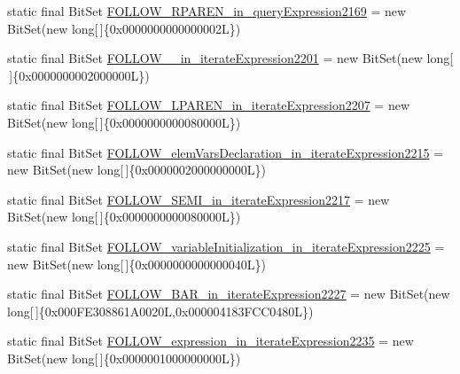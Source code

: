 \begin{DoxyCompactItemize}
\item 
static final Bit\-Set \hyperlink{classorg_1_1tzi_1_1use_1_1parser_1_1testsuite_1_1_test_suite_parser_a4e7e2ebffa87fc40630cc18b11d8a7e7}{F\-O\-L\-L\-O\-W\-\_\-\-R\-P\-A\-R\-E\-N\-\_\-in\-\_\-query\-Expression2169} = new Bit\-Set(new long\mbox{[}$\,$\mbox{]}\{0x0000000000000002\-L\})
\item 
static final Bit\-Set \hyperlink{classorg_1_1tzi_1_1use_1_1parser_1_1testsuite_1_1_test_suite_parser_a78d0d8eeefcde2904c740bc45a37cab9}{F\-O\-L\-L\-O\-W\-\_\-\_\-in\-\_\-iterate\-Expression2201} = new Bit\-Set(new long\mbox{[}$\,$\mbox{]}\{0x0000000002000000\-L\})
\item 
static final Bit\-Set \hyperlink{classorg_1_1tzi_1_1use_1_1parser_1_1testsuite_1_1_test_suite_parser_ae129c137ea4532dccebd9c1ed7f21a38}{F\-O\-L\-L\-O\-W\-\_\-\-L\-P\-A\-R\-E\-N\-\_\-in\-\_\-iterate\-Expression2207} = new Bit\-Set(new long\mbox{[}$\,$\mbox{]}\{0x0000000000080000\-L\})
\item 
static final Bit\-Set \hyperlink{classorg_1_1tzi_1_1use_1_1parser_1_1testsuite_1_1_test_suite_parser_ab47acebe7847abf50196fcc7c462275d}{F\-O\-L\-L\-O\-W\-\_\-elem\-Vars\-Declaration\-\_\-in\-\_\-iterate\-Expression2215} = new Bit\-Set(new long\mbox{[}$\,$\mbox{]}\{0x0000002000000000\-L\})
\item 
static final Bit\-Set \hyperlink{classorg_1_1tzi_1_1use_1_1parser_1_1testsuite_1_1_test_suite_parser_ab759af1a34c7e886b6b2271e7be12b64}{F\-O\-L\-L\-O\-W\-\_\-\-S\-E\-M\-I\-\_\-in\-\_\-iterate\-Expression2217} = new Bit\-Set(new long\mbox{[}$\,$\mbox{]}\{0x0000000000080000\-L\})
\item 
static final Bit\-Set \hyperlink{classorg_1_1tzi_1_1use_1_1parser_1_1testsuite_1_1_test_suite_parser_ae85c7c350d56e358ac97e70afc24f934}{F\-O\-L\-L\-O\-W\-\_\-variable\-Initialization\-\_\-in\-\_\-iterate\-Expression2225} = new Bit\-Set(new long\mbox{[}$\,$\mbox{]}\{0x0000000000000040\-L\})
\item 
static final Bit\-Set \hyperlink{classorg_1_1tzi_1_1use_1_1parser_1_1testsuite_1_1_test_suite_parser_ac8ef15a21ede7351f743150ef4b8e8dd}{F\-O\-L\-L\-O\-W\-\_\-\-B\-A\-R\-\_\-in\-\_\-iterate\-Expression2227} = new Bit\-Set(new long\mbox{[}$\,$\mbox{]}\{0x000\-F\-E308861\-A0020\-L,0x000004183\-F\-C\-C0480\-L\})
\item 
static final Bit\-Set \hyperlink{classorg_1_1tzi_1_1use_1_1parser_1_1testsuite_1_1_test_suite_parser_a96ae5a521acc747de80b126392e7d6bb}{F\-O\-L\-L\-O\-W\-\_\-expression\-\_\-in\-\_\-iterate\-Expression2235} = new Bit\-Set(new long\mbox{[}$\,$\mbox{]}\{0x0000001000000000\-L\})

\end{DoxyCompactItemize}

